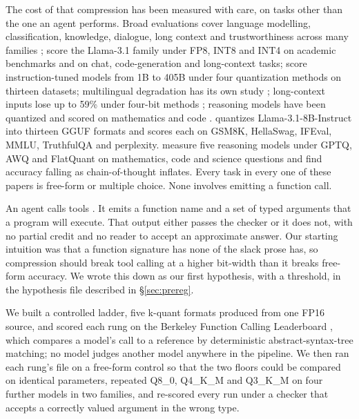 \documentclass[12pt,letterpaper]{article}
\begin{document}
The cost of that compression has been measured with care, on tasks other than the one an agent performs. Broad evaluations cover language modelling, classification, knowledge, dialogue, long context and trustworthiness across many families \citep{jin2024comprehensive,li2024evaluating}; \citet{kurtic2024bf16} score the Llama-3.1 family under FP8, INT8 and INT4 on academic benchmarks and on chat, code-generation and long-context tasks; \citet{lee2024tradeoffs} score instruction-tuned models from 1B to 405B under four quantization methods on thirteen datasets; multilingual degradation has its own study \citep{marchisio2024multilingual}; long-context inputs lose up to 59\% under four-bit methods \citep{mekala2025longcontext}; reasoning models have been quantized and scored on mathematics and code \citep{liu2025quanthurts}. \citet{kurt2026quant} quantizes Llama-3.1-8B-Instruct into thirteen GGUF formats and scores each on GSM8K, HellaSwag, IFEval, MMLU, TruthfulQA and perplexity. \citet{lotfi2026overthink} measure five reasoning models under GPTQ, AWQ and FlatQuant on mathematics, code and science questions and find accuracy falling as chain-of-thought inflates. Every task in every one of these papers is free-form or multiple choice. None involves emitting a function call.

An agent calls tools \citep{patil2023gorilla,qin2023toolllm,yao2024taubench}. It emits a function name and a set of typed arguments that a program will execute. That output either passes the checker or it does not, with no partial credit and no reader to accept an approximate answer. Our starting intuition was that a function signature has none of the slack prose has, so compression should break tool calling at a higher bit-width than it breaks free-form accuracy. We wrote this down as our first hypothesis, with a threshold, in the hypothesis file described in \S\ref{sec:prereg}.

We built a controlled ladder, five k-quant formats produced from one FP16 source, and scored each rung on the Berkeley Function Calling Leaderboard \citep{bfcl2025}, which compares a model's call to a reference by deterministic abstract-syntax-tree matching; no model judges another model anywhere in the pipeline. We then ran each rung's file on a free-form control so that the two floors could be compared on identical parameters, repeated Q8\_0, Q4\_K\_M and Q3\_K\_M on four further models in two families, and re-scored every run under a checker that accepts a correctly valued argument in the wrong type.
\end{document}
